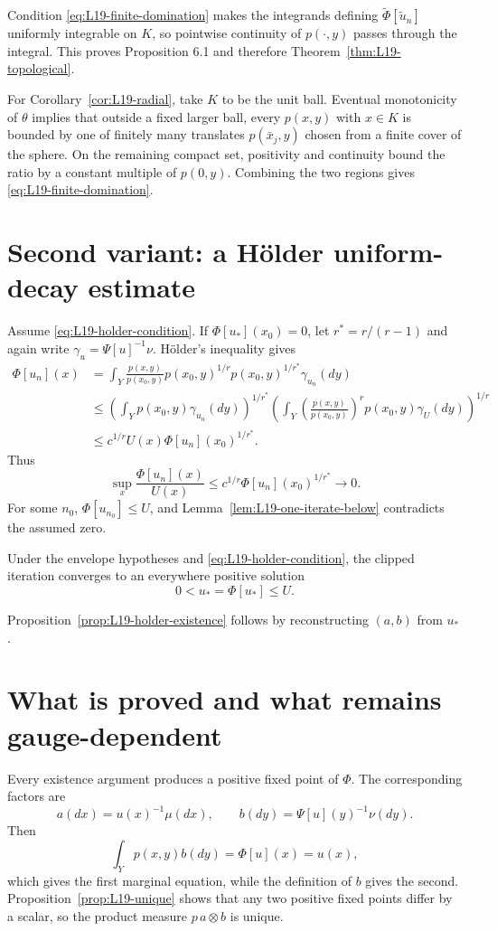 Condition \eqref{eq:L19-finite-domination} makes the integrands defining $\widetilde\Phi[\widetilde u_n]$ uniformly integrable on $K$, so pointwise continuity of $p(\cdot,y)$ passes through the integral.  This proves Proposition 6.1 and therefore Theorem~\ref{thm:L19-topological}.

For Corollary~\ref{cor:L19-radial}, take $K$ to be the unit ball.  Eventual monotonicity of $\theta$ implies that outside a fixed larger ball, every $p(x,y)$ with $x\in K$ is bounded by one of finitely many translates $p(\bar x_j,y)$ chosen from a finite cover of the sphere.  On the remaining compact set, positivity and continuity bound the ratio by a constant multiple of $p(0,y)$.  Combining the two regions gives \eqref{eq:L19-finite-domination}.

\section{Second variant: a H\"older uniform-decay estimate}
Assume \eqref{eq:L19-holder-condition}.  If $\Phi[u_*](x_0)=0$, let $r^*=r/(r-1)$ and again write $\gamma_u=\Psi[u]^{-1}\nu$.  H\"older's inequality gives
\begin{align*}
 \Phi[u_n](x)
 &=\int_Y\frac{p(x,y)}{p(x_0,y)}
   p(x_0,y)^{1/r}p(x_0,y)^{1/r^*}\gamma_{u_n}(dy)\\
 &\le
 \left(\int_Yp(x_0,y)\gamma_{u_n}(dy)\right)^{1/r^*}
 \left(\int_Y\left(\frac{p(x,y)}{p(x_0,y)}\right)^r
 p(x_0,y)\gamma_U(dy)\right)^{1/r}\\
 &\le c^{1/r}U(x)\Phi[u_n](x_0)^{1/r^*}.
\end{align*}
Thus
\begin{equation}\label{eq:L19-holder-uniform}
 \sup_x\frac{\Phi[u_n](x)}{U(x)}
 \le c^{1/r}\Phi[u_n](x_0)^{1/r^*}\longrightarrow0.
\end{equation}
For some $n_0$, $\Phi[u_{n_0}]\le U$, and Lemma~\ref{lem:L19-one-iterate-below} contradicts the assumed zero.

\begin{proposition}\label{prop:L19-holder-fixed}
Under the envelope hypotheses and \eqref{eq:L19-holder-condition}, the clipped iteration converges to an everywhere positive solution
\[
 0<u_*=\Phi[u_*]\le U.
\]
\end{proposition}
Proposition~\ref{prop:L19-holder-existence} follows by reconstructing $(a,b)$ from $u_*$.

\section{What is proved and what remains gauge-dependent}
Every existence argument produces a positive fixed point of $\Phi$.  The corresponding factors are
\[
 a(dx)=u(x)^{-1}\mu(dx),
 \qquad
 b(dy)=\Psi[u](y)^{-1}\nu(dy).
\]
Then
\[
 \int_Yp(x,y)b(dy)=\Phi[u](x)=u(x),
\]
which gives the first marginal equation, while the definition of $b$ gives the second.  Proposition~\ref{prop:L19-unique} shows that any two positive fixed points differ by a scalar, so the product measure $p\,a\otimes b$ is unique.

